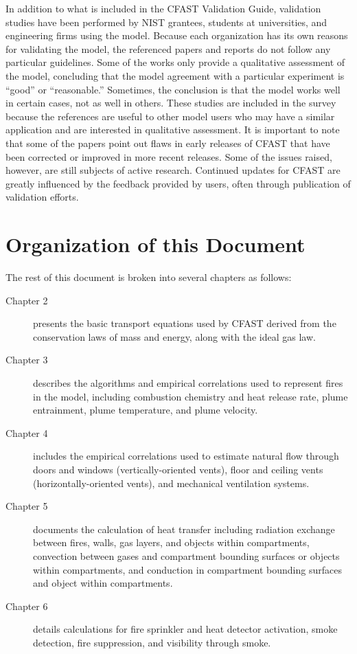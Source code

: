 \documentclass[12pt]{book}
\begin{document}
In addition to what is included in the CFAST Validation Guide, validation studies have been performed by NIST grantees, students at universities, and engineering firms using the model.  Because each organization has its  own reasons for  validating the model, the  referenced papers and reports do not follow any particular guidelines. Some of the works only provide  a qualitative assessment  of the model,  concluding that the  model  agreement with  a  particular  experiment  is ``good''  or ``reasonable.'' Sometimes, the conclusion is that the model works well in certain cases, not as well in others. These studies are included in the survey because the references  are useful to other model users who may have a similar application  and are interested in qualitative assessment. It is important to note  that some of the papers point out flaws in early releases of CFAST that have been corrected or improved in more recent  releases. Some of  the issues raised, however,  are still subjects of  active research. Continued updates for CFAST  are greatly influenced by the feedback provided by users, often through publication of validation efforts.

\section{Organization of this Document}

The rest of this document is broken into several chapters as follows:

\begin{description}
\item[Chapter 2] presents the basic transport equations used by CFAST derived from the conservation laws of mass and energy, along with the ideal gas law.
\item[Chapter 3] describes the algorithms and empirical correlations used to represent fires in the model, including combustion chemistry and heat release rate, plume entrainment, plume temperature, and plume velocity.
\item[Chapter 4] includes the empirical correlations used to estimate natural flow through doors and windows (vertically-oriented vents), floor and ceiling vents (horizontally-oriented vents), and mechanical ventilation systems.
\item[Chapter 5] documents the calculation of heat transfer including radiation exchange between fires, walls, gas layers, and objects within compartments, convection between gases and compartment bounding surfaces or objects within compartments, and conduction in compartment bounding surfaces and object within compartments.
\item[Chapter 6] details calculations for fire sprinkler and heat detector activation, smoke detection, fire suppression, and visibility through smoke.
\end{description}
\end{document}
